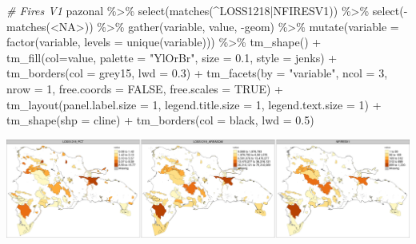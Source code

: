 \documentclass[10pt,landscape,a3paper]{article}
\newenvironment{Shaded}{\begin{snugshade}}{\end{snugshade}}
\newcommand{\AttributeTok}[1]{\textcolor[rgb]{0.77,0.63,0.00}{#1}}
\newcommand{\CommentTok}[1]{\textcolor[rgb]{0.56,0.35,0.01}{\textit{#1}}}
\newcommand{\ConstantTok}[1]{\textcolor[rgb]{0.00,0.00,0.00}{#1}}
\newcommand{\DecValTok}[1]{\textcolor[rgb]{0.00,0.00,0.81}{#1}}
\newcommand{\FloatTok}[1]{\textcolor[rgb]{0.00,0.00,0.81}{#1}}
\newcommand{\FunctionTok}[1]{\textcolor[rgb]{0.00,0.00,0.00}{#1}}
\newcommand{\NormalTok}[1]{#1}
\newcommand{\SpecialCharTok}[1]{\textcolor[rgb]{0.00,0.00,0.00}{#1}}
\newcommand{\StringTok}[1]{\textcolor[rgb]{0.31,0.60,0.02}{#1}}
\begin{document}
\begin{Shaded}
\begin{Highlighting}[]

\CommentTok{\# Fires V1}
\NormalTok{pazonal }\SpecialCharTok{\%\textgreater{}\%} \FunctionTok{select}\NormalTok{(}\FunctionTok{matches}\NormalTok{(}\StringTok{\textquotesingle{}\^{}LOSS1218|NFIRESV1\textquotesingle{}}\NormalTok{)) }\SpecialCharTok{\%\textgreater{}\%} \FunctionTok{select}\NormalTok{(}\SpecialCharTok{{-}}\FunctionTok{matches}\NormalTok{(}\StringTok{\textquotesingle{}\textless{}NA\textgreater{}\textquotesingle{}}\NormalTok{)) }\SpecialCharTok{\%\textgreater{}\%} 
  \FunctionTok{gather}\NormalTok{(variable, value, }\SpecialCharTok{{-}}\NormalTok{geom) }\SpecialCharTok{\%\textgreater{}\%}
  \FunctionTok{mutate}\NormalTok{(}\AttributeTok{variable =} \FunctionTok{factor}\NormalTok{(variable, }\AttributeTok{levels =} \FunctionTok{unique}\NormalTok{(variable))) }\SpecialCharTok{\%\textgreater{}\%} 
  \FunctionTok{tm\_shape}\NormalTok{() }\SpecialCharTok{+}
  \FunctionTok{tm\_fill}\NormalTok{(}\AttributeTok{col=}\StringTok{\textquotesingle{}value\textquotesingle{}}\NormalTok{, }\AttributeTok{palette =} \StringTok{"YlOrBr"}\NormalTok{, }\AttributeTok{size =} \FloatTok{0.1}\NormalTok{, }\AttributeTok{style =} \StringTok{\textquotesingle{}jenks\textquotesingle{}}\NormalTok{) }\SpecialCharTok{+}
  \FunctionTok{tm\_borders}\NormalTok{(}\AttributeTok{col =} \StringTok{\textquotesingle{}grey15\textquotesingle{}}\NormalTok{, }\AttributeTok{lwd =} \FloatTok{0.3}\NormalTok{) }\SpecialCharTok{+}
  \FunctionTok{tm\_facets}\NormalTok{(}\AttributeTok{by =} \StringTok{"variable"}\NormalTok{, }\AttributeTok{ncol =} \DecValTok{3}\NormalTok{, }\AttributeTok{nrow =} \DecValTok{1}\NormalTok{, }\AttributeTok{free.coords =} \ConstantTok{FALSE}\NormalTok{, }\AttributeTok{free.scales =} \ConstantTok{TRUE}\NormalTok{) }\SpecialCharTok{+}
  \FunctionTok{tm\_layout}\NormalTok{(}\AttributeTok{panel.label.size =} \DecValTok{1}\NormalTok{, }\AttributeTok{legend.title.size =} \DecValTok{1}\NormalTok{, }\AttributeTok{legend.text.size =} \DecValTok{1}\NormalTok{) }\SpecialCharTok{+} 
  \FunctionTok{tm\_shape}\NormalTok{(}\AttributeTok{shp =}\NormalTok{ cline) }\SpecialCharTok{+} \FunctionTok{tm\_borders}\NormalTok{(}\AttributeTok{col =} \StringTok{\textquotesingle{}black\textquotesingle{}}\NormalTok{, }\AttributeTok{lwd =} \FloatTok{0.5}\NormalTok{)}
\end{Highlighting}
\end{Shaded}

\begin{center}\includegraphics{img/zonal-pa-10} \end{center}
\end{document}
